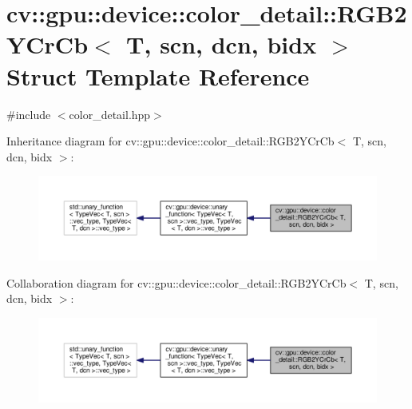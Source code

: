 \hypertarget{structcv_1_1gpu_1_1device_1_1color__detail_1_1RGB2YCrCb}{\section{cv\-:\-:gpu\-:\-:device\-:\-:color\-\_\-detail\-:\-:R\-G\-B2\-Y\-Cr\-Cb$<$ T, scn, dcn, bidx $>$ Struct Template Reference}
\label{structcv_1_1gpu_1_1device_1_1color__detail_1_1RGB2YCrCb}
}


{\ttfamily \#include $<$color\-\_\-detail.\-hpp$>$}



Inheritance diagram for cv\-:\-:gpu\-:\-:device\-:\-:color\-\_\-detail\-:\-:R\-G\-B2\-Y\-Cr\-Cb$<$ T, scn, dcn, bidx $>$\-:\nopagebreak
\begin{figure}[H]
\begin{center}
\leavevmode
\includegraphics[width=350pt]{structcv_1_1gpu_1_1device_1_1color__detail_1_1RGB2YCrCb__inherit__graph}
\end{center}
\end{figure}


Collaboration diagram for cv\-:\-:gpu\-:\-:device\-:\-:color\-\_\-detail\-:\-:R\-G\-B2\-Y\-Cr\-Cb$<$ T, scn, dcn, bidx $>$\-:\nopagebreak
\begin{figure}[H]
\begin{center}
\leavevmode
\includegraphics[width=350pt]{structcv_1_1gpu_1_1device_1_1color__detail_1_1RGB2YCrCb__coll__graph}
\end{center}
\end{figure}
